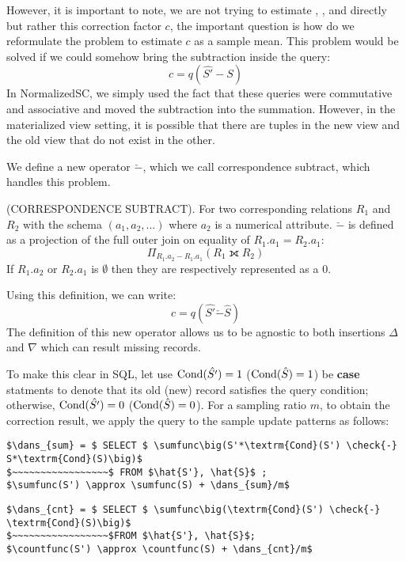 However, it is important to note, we are not trying to estimate \sumfunc, \countfunc, and \avgfunc directly but rather this correction factor $c$, the important question is how do we reformulate the problem to estimate $c$ as a sample mean.
This problem would be solved if we could somehow bring the subtraction inside the query:
\[ c = q(\hat{S'} - S)\] 
In NormalizedSC, we simply used the fact that these queries were commutative and associative and moved the subtraction into the summation.
However, in the materialized view setting, it is possible that there are tuples in the new view and the old view that do not exist in the other.

We define a new operator $\check{-}$, which we call correspondence subtract, which handles this problem.
\begin{definition} (CORRESPONDENCE SUBTRACT). For two corresponding relations $R_1$ and $R_2$ with the schema $(a_1, a_2, ...)$ where 
$a_2$ is a numerical attribute. $\check{-}$ is defined as a projection of the full outer join on equality of $R_1.a_1 = R_2.a_1$: \[ \Pi_{R_1.a_2 - R_1.a_1} ( R_1 \fullouterjoin R_2 ) \]
 If $R_1.a_2$ or $R_2.a_1$ is $\emptyset$ then they are respectively represented as a $0$.
\end{definition}
Using this definition, we can write:
\[ c = q(\hat{S'} \check{-} \hat{S})\] 
The definition of this new operator allows us to be agnostic to both insertions $\Delta$ and $\nabla$ which can result missing records.

To make this clear in SQL, let use $\textrm{Cond}(\hat{S'})=1$ ($\textrm{Cond}(\hat{S})=1$) be \textbf{case} statments to denote that its old (new) record satisfies the query condition; otherwise, $\textrm{Cond}(\hat{S'})=0$ ($\textrm{Cond}(\hat{S})=0$). 
For a sampling ratio $m$, to obtain the correction result, we apply the query to the sample update patterns as follows:
\begin{lstlisting}[mathescape,basicstyle={\scriptsize}]
$\dans_{sum} = $ SELECT $ \sumfunc\big(S'*\textrm{Cond}(S') \check{-} S*\textrm{Cond}(S)\big)$ 
$~~~~~~~~~~~~~~~~~$ FROM $\hat{S'}, \hat{S}$ ;
$\sumfunc(S') \approx \sumfunc(S) + \dans_{sum}/m$
\end{lstlisting}

\begin{lstlisting}[mathescape,basicstyle={\scriptsize}]
$\dans_{cnt} = $ SELECT $ \sumfunc\big(\textrm{Cond}(S') \check{-} \textrm{Cond}(S)\big)$ 
$~~~~~~~~~~~~~~~~~$FROM $\hat{S'}, \hat{S}$;
$\countfunc(S') \approx \countfunc(S) + \dans_{cnt}/m$
\end{lstlisting}


